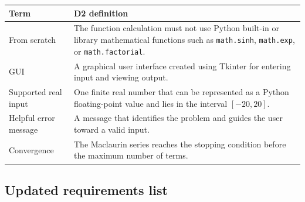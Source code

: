 \documentclass[11pt]{article}
\begin{document}
\begin{longtable}{p{}p{}}
\toprule
\textbf{Term} & \textbf{D2 definition} \\
\midrule
\endhead
From scratch & The function calculation must not use Python built-in or library mathematical functions such as \texttt{math.sinh}, \texttt{math.exp}, or \texttt{math.factorial}. \\
GUI & A graphical user interface created using Tkinter for entering input and viewing output. \\
Supported real input & One finite real number that can be represented as a Python floating-point value and lies in the interval $[-20,20]$. \\
Helpful error message & A message that identifies the problem and guides the user toward a valid input. \\
Convergence & The Maclaurin series reaches the stopping condition before the maximum number of terms. \\
\bottomrule
\end{longtable}

\subsection{Updated requirements list}
\end{document}
